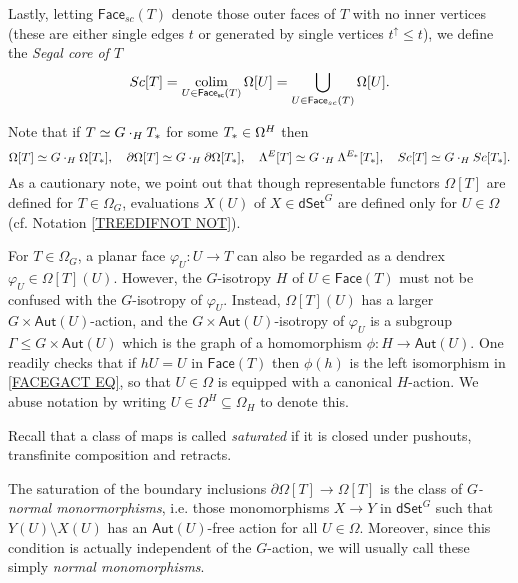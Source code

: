 \documentclass[a4paper,10pt
,draft
]{article}%
\begin{document}
Lastly, letting $\mathsf{Face}_{sc}(T)$ denote those outer faces of $T$ with no inner vertices (these are either single edges $t$ or generated by single vertices $t^{\uparrow} \leq t$), we define the 
\textit{Segal core of $T$}
\[
	Sc[T] 
= 
	\mathop{\operatorname{colim}}_{U \in 
	\mathsf{Face_{sc}}(T)}
	\Omega[U] 
=
	\bigcup_{U \in 
	\mathsf{Face}_{sc}(T)}
	\Omega[U].
\]

Note that if $T \simeq G \cdot_H T_{\**}$ for some $T_{\**} \in \Omega^H$ then 
\begin{equation}\label{T_DECOMP_EQ}
	\Omega[T] \simeq G \cdot_H \Omega[T_{\**}], 
\quad
	\partial \Omega[T] \simeq G \cdot_H \partial \Omega[T_{\**}], \quad
	\Lambda^{E}[T] \simeq G \cdot_H \Lambda^{E_{\**}}[T_{\**}],
\quad
	Sc[T] \simeq G \cdot_H Sc[T_{\**}].
\end{equation}
As a cautionary note, we point out that though representable functors $\Omega[T]$ are defined for $T \in \Omega_G$,
evaluations $X(U)$ of $X \in \mathsf{dSet}^G$
are defined only for $U \in \Omega$ (cf. Notation \ref{TREEDIFNOT NOT}).

\begin{remark}\label{FACEGACT REM}
	For $T \in \Omega_G$, a planar face $\varphi_U \colon U \to T$
	can also be regarded as a dendrex $\varphi_U \in \Omega[T](U)$.
	However, the $G$-isotropy $H$ of $U \in \mathsf{Face}(T)$ must not be confused with the $G$-isotropy of $\varphi_U$.
	Instead, $\Omega[T](U)$ has a larger $G \times \mathsf{Aut}(U)$-action,
	and the $G \times \mathsf{Aut}(U)$-isotropy of $\varphi_U$
	is a subgroup 
	$\Gamma \leq G \times \mathsf{Aut}(U)$
	which is the graph of a homomorphism
	$\phi\colon H \to \mathsf{Aut}(U)$.
	One readily checks that if $hU = U$ in $\mathsf{Face}(T)$ then
	$\phi(h)$ is the left isomorphism in \eqref{FACEGACT EQ},
	so that $U\in \Omega$ is equipped with a canonical $H$-action.
	We abuse notation by writing 
	$U \in \Omega^H \subseteq \Omega_H$ to denote this.  
\end{remark}

Recall that a class of maps is called \textit{saturated} if it is closed under pushouts, transfinite composition and retracts. 

The saturation of the boundary inclusions 
$\partial \Omega[T] \to \Omega[T]$
is the class of \textit{$G$-normal monormorphisms},
i.e. those monomorphisms $X \to Y$ in $\mathsf{dSet}^G$ such that
$Y(U) \setminus X(U)$ has an $\mathsf{Aut}(U)$-free action for all $U \in \Omega$. 
Moreover, since this condition is actually independent of the $G$-action, we will usually call these simply \textit{normal monomorphisms}.
\end{document}
